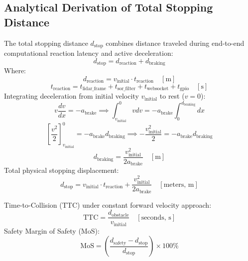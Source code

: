 \documentclass[11pt, a4paper]{article}
\begin{document}
\subsection{Analytical Derivation of Total Stopping Distance}
The total stopping distance $d_{\text{stop}}$ combines distance traveled during end-to-end computational reaction latency and active deceleration:
\begin{equation}
    d_{\text{stop}} = d_{\text{reaction}} + d_{\text{braking}}
\end{equation}
Where:
\begin{equation}
    d_{\text{reaction}} = v_{\text{initial}} \cdot t_{\text{reaction}} \quad [\text{m}]
\end{equation}
\begin{equation}
    t_{\text{reaction}} = t_{\text{lidar\_frame}} + t_{\text{sor\_filter}} + t_{\text{websocket}} + t_{\text{gpio}} \quad [\text{s}]
\end{equation}
Integrating deceleration from initial velocity $v_{\text{initial}}$ to rest ($v = 0$):
\begin{equation}
    v \frac{dv}{dx} = -a_{\text{brake}} \implies \int_{v_{\text{initial}}}^0 v dv = -a_{\text{brake}} \int_0^{d_{\text{braking}}} dx
\end{equation}
\begin{equation}
    \left[ \frac{v^2}{2} \right]_{v_{\text{initial}}}^0 = -a_{\text{brake}} d_{\text{braking}} \implies -\frac{v_{\text{initial}}^2}{2} = -a_{\text{brake}} d_{\text{braking}}
\end{equation}
\begin{equation}
    d_{\text{braking}} = \frac{v_{\text{initial}}^2}{2 a_{\text{brake}}} \quad [\text{m}]
\end{equation}
Total physical stopping displacement:
\begin{equation}
    d_{\text{stop}} = v_{\text{initial}} \cdot t_{\text{reaction}} + \frac{v_{\text{initial}}^2}{2 a_{\text{brake}}} \quad [\text{meters, m}]
\end{equation}

Time-to-Collision (TTC) under constant forward velocity approach:
\begin{equation}
    \text{TTC} = \frac{d_{\text{obstacle}}}{v_{\text{initial}}} \quad [\text{seconds, s}]
\end{equation}
Safety Margin of Safety (MoS):
\begin{equation}
    \text{MoS} = \left(\frac{d_{\text{safety}} - d_{\text{stop}}}{d_{\text{stop}}}\right) \times 100\%
\end{equation}
\end{document}
